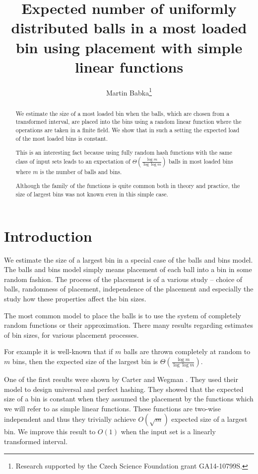 \documentclass{article}
\title{Expected number of uniformly distributed balls in a most loaded bin using placement with simple linear functions}
\author{Martin Babka\thanks{Research supported by the Czech Science Foundation grant GA14-10799S.}}
\begin{document}
\maketitle

\begin{abstract}
We estimate the size of a most loaded bin when the balls, which are chosen from a transformed interval, are placed into the bins using a random linear function where the operations are taken in a finite field.
We show that in such a setting the expected load of the most loaded bins is constant.

This is an interesting fact because using fully random hash functions with the same class of input sets leads to an expectation of $\Theta\left(\frac{\log m}{\log \log m}\right)$ balls in most loaded bins where $m$ is the number of balls and bins.

Although the family of the functions is quite common both in theory and practice, the size of largest bins was not known even in this simple case.
\end{abstract}

\section{Introduction}

We estimate the size of a largest bin in a special case of the balls and bins model. The balls and bins model simply means placement of each ball into a bin in some random fashion. The process of the placement is of a various study -- choice of balls, randomness of placement, independence of the placement and especially the study how these properties affect the bin sizes.

The most common model to place the balls is to use the system of completely random functions or their approximation. There many results regarding estimates of bin sizes, for various placement processes.

For example it is well-known that if $m$ balls are thrown completely at random to $m$ bins, then the expected size of the largest bin is $\Theta\left(\frac{\log m}{\log \log m}\right)$.

One of the first results were shown by Carter and Wegman \cite{cw}. They used their model to design universal and perfect hashing. They showed that the expected size of a bin is constant when they assumed the placement by the functions which we will refer to as simple linear functions. These functions are two-wise independent and thus they trivially achieve $O(\sqrt{m})$ expected size of a largest bin. We improve this result to $O(1)$ when the input set is a linearly transformed interval.
\end{document}
